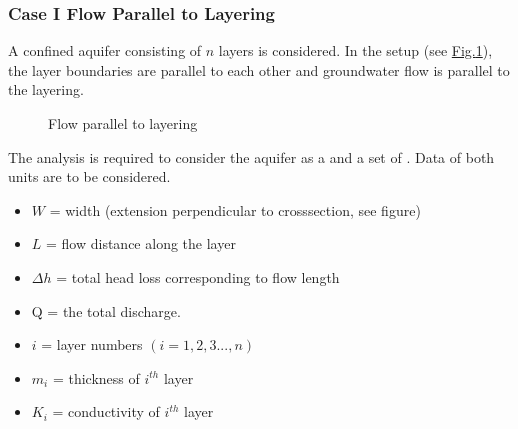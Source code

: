 \documentclass[letterpaper,10pt,english]{sphinxmanual}
\begin{document}
\subsubsection{Case I \sphinxhyphen{} Flow Parallel to Layering}
\label{\detokenize{contents/flow/lecture_05/15_het_iso:case-i-flow-parallel-to-layering}}
A confined aquifer consisting of \(n\) layers is considered. In the set\sphinxhyphen{}up (see \hyperref[\detokenize{contents/flow/lecture_05/15_het_iso:flow-parallel}]{Fig.\@ \ref{\detokenize{contents/flow/lecture_05/15_het_iso:flow-parallel}}}), the layer boundaries are parallel to each other and groundwater flow is parallel to the layering.

\begin{figure}[htbp]
\centering
\capstart

\noindent{}
\caption{Flow parallel to layering}\label{\detokenize{contents/flow/lecture_05/15_het_iso:flow-parallel}}\end{figure}

The analysis is required to consider the aquifer as a  and a set of . Data of both units are to be considered.

\begin{itemize}
\item {} 
\(W\) = width (extension perpendicular to cross\sphinxhyphen{}section, see figure)

\item {} 
\(L\) = flow distance along the layer

\item {} 
\(\Delta h\) = total head loss corresponding to flow length

\item {} 
Q = the total discharge.

\end{itemize}

\begin{itemize}
\item {} 
\(i\) = layer numbers \((i = 1,2,3 ..., n)\)

\item {} 
\(m_i\) = thickness of \(i^{th}\) layer

\item {} 
\(K_i\) = conductivity of \(i^{th}\) layer

\end{itemize}
\end{document}
